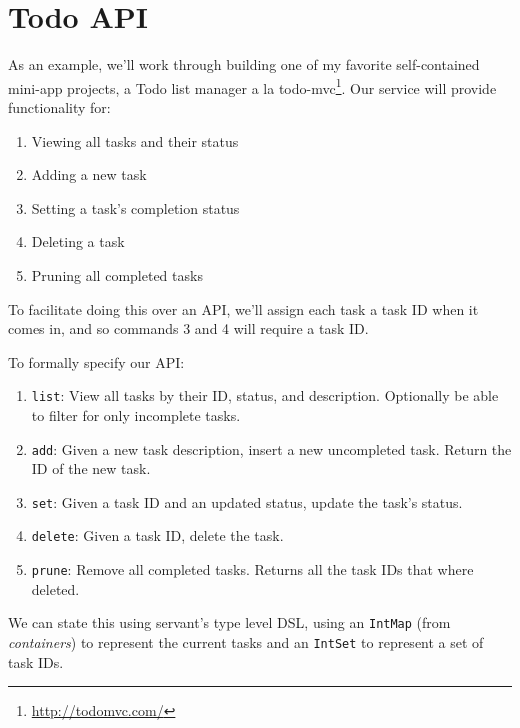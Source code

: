 \documentclass[]{article}
\renewcommand{\href}[2]{#2\footnote{\url{#1}}}
\begin{document}
\section{Todo API}\label{todo-api}

As an example, we'll work through building one of my favorite self-contained
mini-app projects, a \href{http://todomvc.com/}{Todo list manager a la
todo-mvc}. Our service will provide functionality for:

\begin{enumerate}
\def\labelenumi{\arabic{enumi}.}
\tightlist
\item
  Viewing all tasks and their status
\item
  Adding a new task
\item
  Setting a task's completion status
\item
  Deleting a task
\item
  Pruning all completed tasks
\end{enumerate}

To facilitate doing this over an API, we'll assign each task a task ID when it
comes in, and so commands 3 and 4 will require a task ID.

To formally specify our API:

\begin{enumerate}
\def\labelenumi{\arabic{enumi}.}
\tightlist
\item
  \texttt{list}: View all tasks by their ID, status, and description. Optionally
  be able to filter for only incomplete tasks.
\item
  \texttt{add}: Given a new task description, insert a new uncompleted task.
  Return the ID of the new task.
\item
  \texttt{set}: Given a task ID and an updated status, update the task's status.
\item
  \texttt{delete}: Given a task ID, delete the task.
\item
  \texttt{prune}: Remove all completed tasks. Returns all the task IDs that
  where deleted.
\end{enumerate}

We can state this using servant's type level DSL, using an \texttt{IntMap} (from
\emph{containers}) to represent the current tasks and an \texttt{IntSet} to
represent a set of task IDs.
\end{document}
